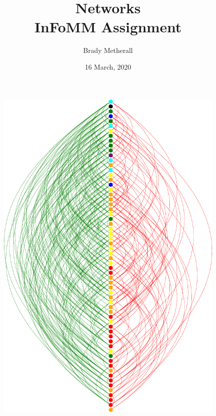\documentclass[11pt,a4paper,twocolumn]{article}
\title{Networks \\ InFoMM Assignment}
\author{Brady Metherall}
\date{16 March, 2020}
\begin{document}
\maketitle

\begin{figure}[tbp]
	\centering
	\includegraphics[width=0.75\columnwidth]{Heirarchy}
	\caption{}
	\label{fig:heir}
\end{figure}

\cite{debacco}

\cite{wirth}

\cite{vanderkam}


\end{document}
